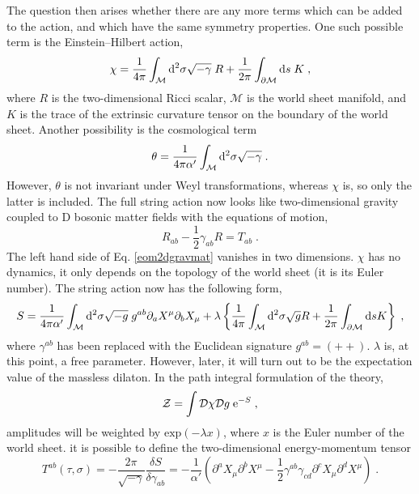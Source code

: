 \documentclass[11pt]{article} %
\begin{document}
The question then arises whether there are any more terms which can be added to the action, and which have the same symmetry properties. One such possible term is the Einstein--Hilbert action,
\begin{equation}
	\chi = \dfrac{1}{4\pi}\int_{\mathcal{M}} \mathrm{d}^2\sigma \sqrt{-\gamma}\;R + \dfrac{1}{2\pi}\int_{\partial\mathcal{M}}\mathrm{d} s\;K\;,
\end{equation}
where $R$ is the two-dimensional Ricci scalar, $\mathcal{M}$ is the world sheet manifold, and $K$ is the trace of the extrinsic curvature tensor on the boundary of the world sheet. 
Another possibility is the cosmological term 
\begin{equation}
	\theta = \dfrac{1}{4\pi\alpha'}\int_{\mathcal{M}} \mathrm{d}^2\sigma\sqrt{-\gamma}\;.
\end{equation}
However, $\theta$ is not invariant under Weyl transformations, whereas $\chi$ is, so only the latter is included.
The full string action now looks like two-dimensional gravity coupled to D bosonic matter fields with the equations of motion,
\begin{equation}
	R_{ab} - \dfrac{1}{2}\gamma_{ab}R = T_{ab}\;.
	\label{eom2dgravmat}
\end{equation}
The left hand side of Eq. \eqref{eom2dgravmat} vanishes in two dimensions. $\chi$ has no dynamics, it only depends on the topology of the world sheet (it is its Euler number). The string action now has the following form,
\begin{equation}
	S = \dfrac{1}{4\pi\alpha'}\int_{\mathcal{M}}\mathrm{d}^2\sigma\sqrt{-g}\;g^{ab}\partial_aX^{\mu}\partial_bX_{\mu} + \lambda\left\{  \dfrac{1}{4\pi}\int_{\mathcal{M}}\mathrm{d}^2\sigma\sqrt{g}R + \dfrac{1}{2\pi}\int_{\partial\mathcal{M}} \mathrm{d} s K \right\}\;,
\label{stringaction}
\end{equation}
where $\gamma^{ab}$ has been replaced with the Euclidean signature $g^{ab} = (++)$. 
$\lambda$ is, at this point, a free parameter. However, later, it will turn out to be the expectation value of the massless dilaton.\newline
In the path integral formulation of the theory,
\begin{equation}
	\mathcal{Z} = \int\mathcal{D}\chi\mathcal{D}g\;\mathrm{e}^{-S}\;,
\end{equation}
amplitudes will be weighted by $\mathrm{exp}(-\lambda x)$, where $x$ is the Euler number of the world sheet.\newline
it is possible to define the two-dimensional energy-momentum tensor
\begin{equation}
	T^{ab}(\tau,\sigma) = -\dfrac{2\pi}{\sqrt{-\gamma}} \dfrac{\delta S}{\delta\gamma_{ab}} = -\dfrac{1}{\alpha'}\left( \partial^aX_{\mu}\partial^bX^{\mu} - \dfrac{1}{2}\gamma^{ab}\gamma_{cd}\partial^cX_{\mu}\partial^dX^{\mu}  \right)\;.
\end{equation}
\end{document}

